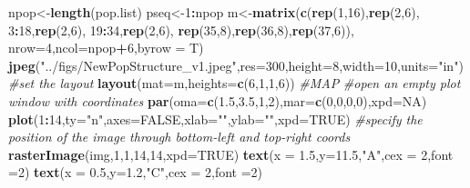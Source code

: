 \documentclass[11pt,]{article}
\newenvironment{Shaded}{\begin{snugshade}}{\end{snugshade}}
\newcommand{\KeywordTok}[1]{\textcolor[rgb]{0.13,0.29,0.53}{\textbf{#1}}}
\newcommand{\DataTypeTok}[1]{\textcolor[rgb]{0.13,0.29,0.53}{#1}}
\newcommand{\DecValTok}[1]{\textcolor[rgb]{0.00,0.00,0.81}{#1}}
\newcommand{\FloatTok}[1]{\textcolor[rgb]{0.00,0.00,0.81}{#1}}
\newcommand{\StringTok}[1]{\textcolor[rgb]{0.31,0.60,0.02}{#1}}
\newcommand{\CommentTok}[1]{\textcolor[rgb]{0.56,0.35,0.01}{\textit{#1}}}
\newcommand{\OtherTok}[1]{\textcolor[rgb]{0.56,0.35,0.01}{#1}}
\newcommand{\OperatorTok}[1]{\textcolor[rgb]{0.81,0.36,0.00}{\textbf{#1}}}
\newcommand{\NormalTok}[1]{#1}
\begin{document}
\begin{Shaded}
\begin{Highlighting}[]
\NormalTok{npop<-}\KeywordTok{length}\NormalTok{(pop.list)}
\NormalTok{pseq<-}\DecValTok{1}\OperatorTok{:}\NormalTok{npop}
\NormalTok{m<-}\KeywordTok{matrix}\NormalTok{(}\KeywordTok{c}\NormalTok{(}\KeywordTok{rep}\NormalTok{(}\DecValTok{1}\NormalTok{,}\DecValTok{16}\NormalTok{),}\KeywordTok{rep}\NormalTok{(}\DecValTok{2}\NormalTok{,}\DecValTok{6}\NormalTok{),}
            \DecValTok{3}\OperatorTok{:}\DecValTok{18}\NormalTok{,}\KeywordTok{rep}\NormalTok{(}\DecValTok{2}\NormalTok{,}\DecValTok{6}\NormalTok{),}
            \DecValTok{19}\OperatorTok{:}\DecValTok{34}\NormalTok{,}\KeywordTok{rep}\NormalTok{(}\DecValTok{2}\NormalTok{,}\DecValTok{6}\NormalTok{),}
            \KeywordTok{rep}\NormalTok{(}\DecValTok{35}\NormalTok{,}\DecValTok{8}\NormalTok{),}\KeywordTok{rep}\NormalTok{(}\DecValTok{36}\NormalTok{,}\DecValTok{8}\NormalTok{),}\KeywordTok{rep}\NormalTok{(}\DecValTok{37}\NormalTok{,}\DecValTok{6}\NormalTok{)),}
          \DataTypeTok{nrow=}\DecValTok{4}\NormalTok{,}\DataTypeTok{ncol=}\NormalTok{npop}\OperatorTok{+}\DecValTok{6}\NormalTok{,}\DataTypeTok{byrow =}\NormalTok{ T)}
\KeywordTok{jpeg}\NormalTok{(}\StringTok{"../figs/NewPopStructure_v1.jpeg"}\NormalTok{,}\DataTypeTok{res=}\DecValTok{300}\NormalTok{,}\DataTypeTok{height=}\DecValTok{8}\NormalTok{,}\DataTypeTok{width=}\DecValTok{10}\NormalTok{,}\DataTypeTok{units=}\StringTok{"in"}\NormalTok{)}
\CommentTok{#set the layout}
\KeywordTok{layout}\NormalTok{(}\DataTypeTok{mat=}\NormalTok{m,}\DataTypeTok{heights=}\KeywordTok{c}\NormalTok{(}\DecValTok{6}\NormalTok{,}\DecValTok{1}\NormalTok{,}\DecValTok{1}\NormalTok{,}\DecValTok{6}\NormalTok{))}
\CommentTok{#MAP}
\CommentTok{#open an empty plot window with coordinates}
\KeywordTok{par}\NormalTok{(}\DataTypeTok{oma=}\KeywordTok{c}\NormalTok{(}\FloatTok{1.5}\NormalTok{,}\FloatTok{3.5}\NormalTok{,}\DecValTok{1}\NormalTok{,}\DecValTok{2}\NormalTok{),}\DataTypeTok{mar=}\KeywordTok{c}\NormalTok{(}\DecValTok{0}\NormalTok{,}\DecValTok{0}\NormalTok{,}\DecValTok{0}\NormalTok{,}\DecValTok{0}\NormalTok{),}\DataTypeTok{xpd=}\OtherTok{NA}\NormalTok{)}
\KeywordTok{plot}\NormalTok{(}\DecValTok{1}\OperatorTok{:}\DecValTok{14}\NormalTok{,}\DataTypeTok{ty=}\StringTok{"n"}\NormalTok{,}\DataTypeTok{axes=}\OtherTok{FALSE}\NormalTok{,}\DataTypeTok{xlab=}\StringTok{""}\NormalTok{,}\DataTypeTok{ylab=}\StringTok{""}\NormalTok{,}\DataTypeTok{xpd=}\OtherTok{TRUE}\NormalTok{)}
\CommentTok{#specify the position of the image through bottom-left and top-right coords}
\KeywordTok{rasterImage}\NormalTok{(img,}\DecValTok{1}\NormalTok{,}\DecValTok{1}\NormalTok{,}\DecValTok{14}\NormalTok{,}\DecValTok{14}\NormalTok{,}\DataTypeTok{xpd=}\OtherTok{TRUE}\NormalTok{)}
\KeywordTok{text}\NormalTok{(}\DataTypeTok{x =} \FloatTok{1.5}\NormalTok{,}\DataTypeTok{y=}\FloatTok{11.5}\NormalTok{,}\StringTok{"A"}\NormalTok{,}\DataTypeTok{cex =} \DecValTok{2}\NormalTok{,}\DataTypeTok{font =}\DecValTok{2}\NormalTok{)}
\KeywordTok{text}\NormalTok{(}\DataTypeTok{x =} \FloatTok{0.5}\NormalTok{,}\DataTypeTok{y=}\FloatTok{1.2}\NormalTok{,}\StringTok{"C"}\NormalTok{,}\DataTypeTok{cex =} \DecValTok{2}\NormalTok{,}\DataTypeTok{font =}\DecValTok{2}\NormalTok{)}


\end{Highlighting}
\end{Shaded}
\end{document}
